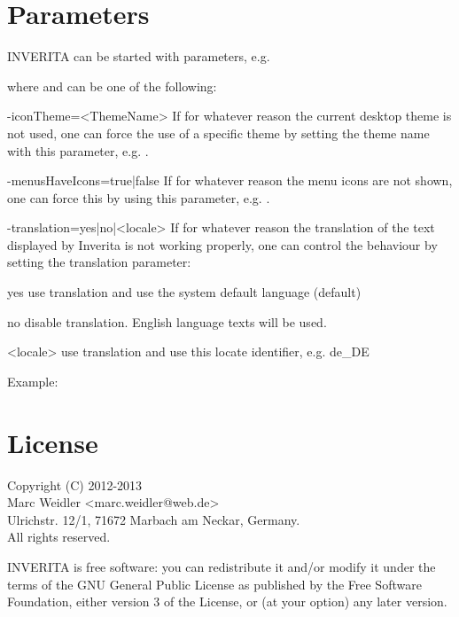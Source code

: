 \section{Parameters}
INVERITA can be started with parameters, e.g.
where  and  can be one of the following:
\begin{attributes}
 \item[-iconTheme=<ThemeName>]
    If for whatever reason the current desktop theme is not used, one can force the
    use of a specific theme by setting the theme name with this parameter, e.g.
    .

  \item[-menusHaveIcons=true|false]
    If for whatever reason the menu icons are not shown, one can force this by using
    this parameter, e.g. .

  \item[-translation=yes|no|<locale>]
    If for whatever reason the translation of the text displayed by Inverita is not
    working properly, one can control the behaviour by setting the translation
    parameter:
    \begin{attributes}[50pt]
       \item[yes]    use translation and use the system default language (default)
       \item[no]     disable translation. English language texts will be used.
       \item[<locale>] use translation and use this locate identifier, e.g. de\_DE
    \end{attributes}
    Example: 
\end{attributes}


\section{License}
Copyright (C) 2012-2013\\
Marc Weidler <marc.weidler@web.de>\\
Ulrichstr. 12/1, 71672 Marbach am Neckar, Germany.\\
All rights reserved.

INVERITA is free software: you can redistribute it and/or modify
it under the terms of the GNU General Public License as published by
the Free Software Foundation, either version 3 of the License, or
(at your option) any later version.

